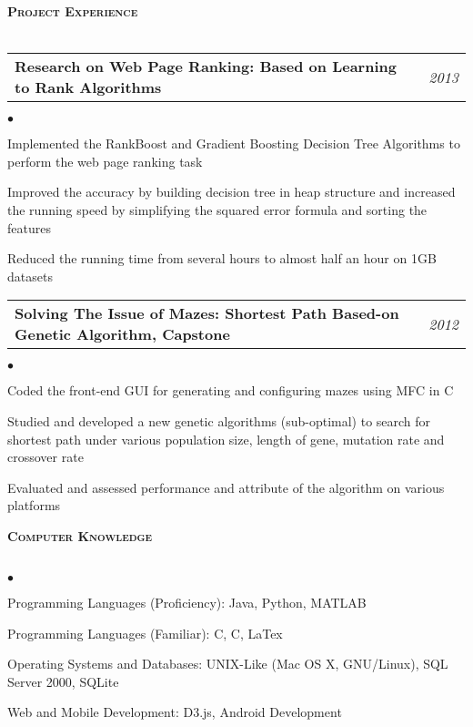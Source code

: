 \documentclass[11pt]{article}
\makeatletter
\newcommand{\lineunder}{\vspace*{-8pt} \\ \hspace*{-18pt} \hrulefill \\}
\newcommand{\header}[1]{{\hspace*{-15pt}\vspace*{6pt} \large \textsc{\textbf{#1}}} \vspace*{-6pt} \lineunder}
\newenvironment{achievements}{\begin{list}{$\bullet$}{\topsep 0pt \itemsep -2pt}}{\vspace*{4pt}\end{list}}
\newcommand{\headerrow}[2]
{\begin{tabular*}{\linewidth}{l@{\extracolsep{\fill}}r}
	\hspace*{-15pt}#1 & #2 \\
\end{tabular*}}
\newcommand{\CPP}
 {C\nolinebreak[4]\hspace{-.05em}\raisebox{.22ex}{\footnotesize\bf ++}}
\makeatother
\begin{document}
\vspace*{2.5pt}
\header{Project Experience}
\headerrow
{\textbf{Research on Web Page Ranking: Based on Learning to Rank Algorithms}}
{\emph{2013}}
	\begin{achievements}
  \item Implemented the RankBoost and Gradient Boosting Decision Tree Algorithms to perform the web page ranking task
  \item Improved the accuracy by building decision tree in heap structure and increased the running speed by simplifying the squared error formula and sorting the features
  \item Reduced the running time from several hours to almost half an hour on 1GB datasets
  \end{achievements}
  
\headerrow
{\textbf{Solving The Issue of Mazes: Shortest Path Based-on Genetic Algorithm, Capstone}}
{\emph{2012}}
	\begin{achievements}
  \item Coded the front-end GUI for generating and configuring mazes using MFC in \CPP
  \item Studied and developed a new genetic algorithms (sub-optimal) to search for shortest path under various population size, length of gene,  mutation rate and crossover rate
  \item Evaluated and assessed performance and attribute of the algorithm on various platforms
  \end{achievements}


\vspace*{2.5pt}
\header{Computer Knowledge}
\begin{achievements}
\item Programming Languages (Proficiency): Java, Python, MATLAB
\item Programming Languages (Familiar):  C, \CPP,  LaTex
\item Operating Systems and Databases: UNIX-Like (Mac OS X, GNU/Linux), SQL Server 2000, SQLite
\item Web and Mobile Development: D3.js, Android Development
\end{achievements}
\end{document}
